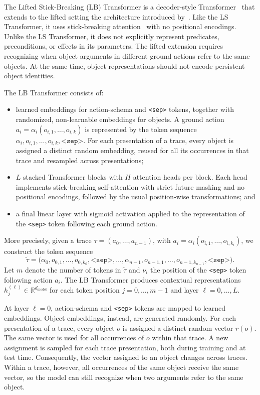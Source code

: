 The Lifted Stick-Breaking (LB) Transformer is a decoder-style
Transformer~\citep{transformers} that extends to the lifted setting the
architecture introduced by~\citet{nunez2026strips}. Like the LS Transformer, it uses stick-breaking
attention~\citep{tan2025scaling} with no positional encodings. Unlike the LS Transformer, it
does not explicitly represent predicates, preconditions, or effects in its
parameters. The lifted extension requires recognizing when object arguments in different
ground actions refer to the same objects. At the same time, object representations should not encode persistent object identities.

The LB Transformer consists of:
\begin{itemize}
\item[(i)] learned embeddings for action-schema and \texttt{<sep>} tokens,
together with randomized, non-learnable embeddings for objects. A ground
action $a_i=\alpha_i(o_{i,1},\ldots,o_{i,k})$ is represented by the token
sequence
$\alpha_i,o_{i,1},\ldots,o_{i,k},\texttt{<sep>}$.
For each presentation of a trace, every object is assigned a distinct random
embedding, reused for all its occurrences in that trace and resampled across
presentations;

\item[(ii)] $L$ stacked Transformer blocks with $H$ attention heads per block.
Each head implements stick-breaking self-attention with strict future masking
and no positional encodings, followed by the usual position-wise
transformations; and

\item[(iii)] a final linear layer with sigmoid activation applied to the
representation of the \texttt{<sep>} token following each ground action.
\end{itemize}

More precisely, given a trace
$\tau=(a_0,\ldots,a_{n-1})$, with
$a_i=\alpha_i(o_{i,1},\ldots,o_{i,k_i})$, we construct the token sequence
\[
\widetilde{\tau}
=
\bigl(
\alpha_0,o_{0,1},\ldots,o_{0,k_0},\texttt{<sep>},
\ldots,
\alpha_{n-1},o_{n-1,1},\ldots,o_{n-1,k_{n-1}},\texttt{<sep>}
\bigr).
\]
Let $m$ denote the number of tokens in $\widetilde{\tau}$ and $\nu_i$ the
position of the \texttt{<sep>} token following action $a_i$.
The LB Transformer produces contextual representations
$h_j^{(\ell)}\in\mathbb{R}^{d_{\text{model}}}$ for each token position
$j=0,\ldots,m-1$ and layer $\ell=0,\ldots,L$.

At layer $\ell=0$, action-schema and \texttt{<sep>} tokens are mapped to
learned embeddings. Object embeddings, instead, are generated randomly.
For each presentation of a trace, every object $o$ is assigned a distinct
random vector $r(o)$. The same vector is used for all occurrences of $o$
within that trace. A new assignment is sampled for each trace presentation,
both during training and at test time.
Consequently, the vector assigned to an object changes across traces. Within
a trace, however, all occurrences of the same object receive the same vector,
so the model can still recognize when two arguments refer to the same object.


